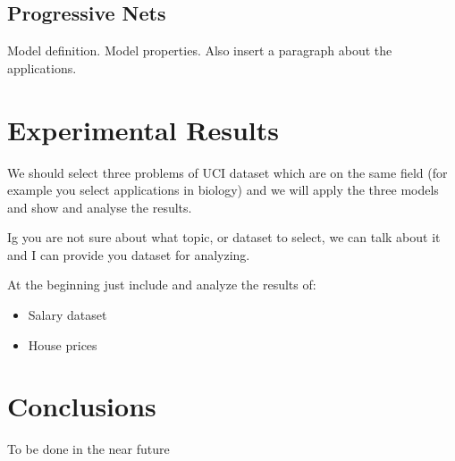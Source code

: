 \documentclass[11pt]{article}
\newcommand{\msb}[1]{{\color{blue}#1}}
\begin{document}
\subsection{Progressive Nets}
Model definition.
Model properties.
Also insert a paragraph about the applications.


\section{Experimental Results}
We should select three problems of UCI dataset which are on the same field (for example you select applications in biology) and we will apply the three models and show and analyse the results.

Ig you are not sure about what topic, or dataset to select, we can talk about it and I can provide you dataset for analyzing.

At the beginning just include and analyze the results of:
\begin{itemize}
\item Salary dataset
\item House prices
\end{itemize}


\section{Conclusions}
\msb{To be done in the near future}


%

\end{document}
